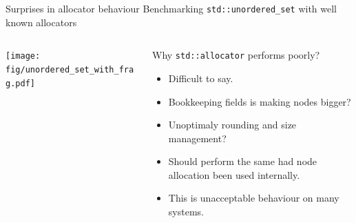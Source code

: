 \documentclass[10pt,aspectratio=169]{beamer}
\begin{document}
\begin{frame}
{Surprises in allocator behaviour}
{Benchmarking \texttt{std::unordered\_set} with well known allocators}
\begin{columns}

    \begin{column}{0.47\textwidth}
        \begin{center}
            
            \texttt{[image: fig/unordered\_set\_with\_frag.pdf]} \\
        \end{center}
    \end{column}

    \begin{column}{0.47\textwidth}
         \begin{block}{Why \texttt{std::allocator} performs poorly?}
           \begin{itemize}
           \item Difficult to say.
           \item Bookkeeping fields is making nodes bigger?
           \item Unoptimaly rounding and size management? 
           \item Should perform the same had node
           allocation been used internally.
           \item {\color{alertc}This is unacceptable behaviour on many systems.}
           \end{itemize}
         \end{block}
    \end{column}

\end{columns}
\end{frame}


\end{document}
